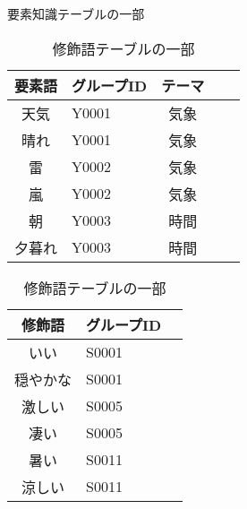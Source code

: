 \begin{table}[htbp]
  \begin{minipage}{.48\linewidth}
    \begin{center}
      \caption{要素知識テーブルの一部}
      \label{tb:youso}
      \begin{tabular}{clclc}
        \hline
        要素語 & グループID & テーマ \\
        \hline
        天気	 & Y0001 & 気象 \\
        晴れ	 & Y0001 & 気象 \\
        雷		 & Y0002 & 気象 \\
        嵐		 & Y0002 & 気象 \\
        朝		 & Y0003 & 時間 \\
        夕暮れ	 & Y0003 & 時間 \\
        \hline
      \end{tabular}
    \end{center}
  \end{minipage}
  \begin{minipage}{.48\linewidth}
    \begin{center}
      \caption{修飾語テーブルの一部}
      \label{tb:syusyokugo}
      \begin{tabular}{clc}
        \hline
        修飾語 		& グループID \\
        \hline
        いい 		& S0001 \\
        穏やかな 	& S0001 \\
        激しい		& S0005 \\
        凄い		& S0005 \\
        暑い		& S0011 \\
        涼しい		& S0011 \\
        \hline
      \end{tabular}
    \end{center}
    \end{minipage}
\end{table}
